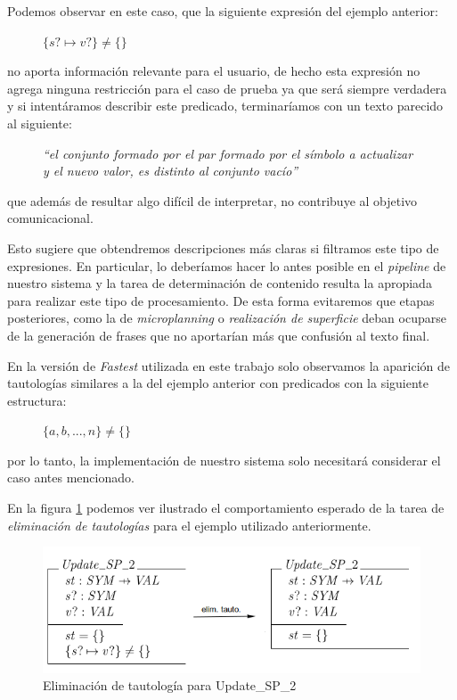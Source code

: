 Podemos observar en este caso, que la siguiente expresión del ejemplo anterior:

\begin{figure}[H]
  \centering
  $\{ s? \mapsto v? \} \neq \{ \}$ 
\end{figure}

\noindent
no aporta información relevante para el usuario, de hecho esta expresión no agrega ninguna restricción para el caso de prueba ya que será siempre verdadera y si intentáramos describir este predicado, terminaríamos con un texto parecido al siguiente:

\begin{figure}[H]
  \centering
  \emph{``el conjunto formado por el par formado por el símbolo a actualizar y el nuevo valor, es distinto al conjunto vacío''}
\end{figure}

\noindent
que además de resultar algo difícil de interpretar, no contribuye al objetivo comunicacional.

Esto sugiere que obtendremos descripciones más claras si filtramos este tipo de expresiones. En particular, lo deberíamos hacer lo antes posible en el \textit{pipeline} de nuestro sistema y la tarea de determinación de contenido resulta la apropiada para realizar este tipo de procesamiento. De esta forma evitaremos que etapas posteriores, como la de \emph{microplanning} o \emph{realización de superficie} deban ocuparse de la generación de frases que no aportarían más que confusión al texto final.

En la versión de \emph{Fastest} utilizada en este trabajo solo observamos la aparición de tautologías similares a la del ejemplo anterior con predicados con la siguiente estructura:

\begin{figure}[H]
  \centering
  $\{ a, b, ... , n \} \neq \{ \}$ 
\end{figure}

\noindent
por lo tanto, la implementación de nuestro sistema solo necesitará considerar el caso antes mencionado. 

En la figura \ref{fig:ej_elim_tauto} podemos ver ilustrado el comportamiento esperado de la tarea de \emph{eliminación de tautologías} para el ejemplo utilizado anteriormente.

\begin{figure}[H]
  	\centering
	\includegraphics[scale=0.4]{img/ej_elim_tauto.png}
	\caption{Eliminación de tautología para Update\_SP\_2}
  	\label{fig:ej_elim_tauto}
\end{figure}

